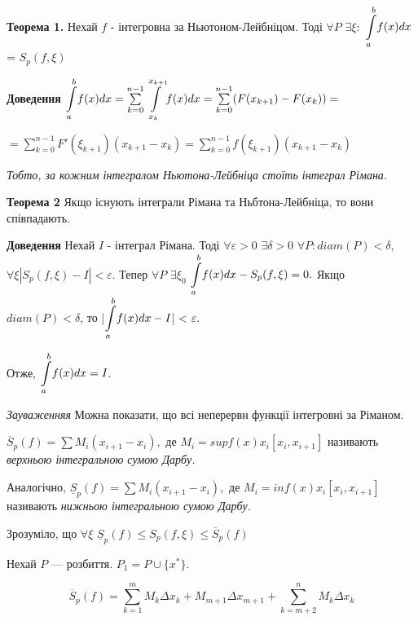 \documentclass[12pt]{report}
\begin{document}
	\textbf{Теорема 1.} Нехай  $ f $ - інтегровна за Ньютоном-Лейбніцом. Тоді $ \forall P  $
	$ \exists \xi : $ $\mathlarger\int\limits_ a^b f(x)dx$ = $ S_p (f, \xi) $
	
	\textbf{Доведення} $\mathlarger\int\limits_ a^b f(x)dx =  \sum\limits_{k=0}^{n-1}\mathlarger\int\limits_{x_k}^{x_{k+1}} f(x)dx = \sum\limits_{k=0}^{n-1}(F(x_{k+1}) - F(x_k)) =$
	
	$=  \sum\limits_{k=0}^{n-1} F'(\xi_{k+1}) (x_{k+1} - x_k) = \sum\limits_{k=0}^{n-1} f(\xi_{k+1})(x_{k+1} - x_k)$
	
	\vspace{5 mm} 
	\textit{Тобто, за кожним інтегралом Ньютона-Лейбніца стоїть інтеграл Рімана.}
	
	\vspace{5 mm} 
	
	\textbf{Теорема 2} Якщо існують інтеграли Рімана та Ньбтона-Лейбніца, то вони співпадають.
	
	\textbf{Доведення} Нехай $ I $ - інтеграл Рімана. Тоді $ \forall \varepsilon > 0 $  $\exists \delta > 0  $ $ \forall P: diam (P)  < \delta , $  $ \forall \xi |S_p(f, \xi) - I| < \varepsilon.$ Тепер 
	$ \forall P$ $ \exists \xi_0  $ $ \mathlarger\int\limits_a^b f(x) dx - S_p (f, \xi) = 0.$
	Якщо $ diam(P)< \delta $, то |$\mathlarger\int\limits_a^b f(x) dx  - I  $| < $ \varepsilon. $
	
	Отже, $\mathlarger\int\limits_a^b f(x) dx   = I$.
	
	\vspace{5 mm} 
	\textit{Зауваженняя} Можна показати, що всі неперервн функції інтегровні за Ріманом.
	
	\vspace{5 mm} 
	
	$ \overline S_p(f) = \sum M_i (x_{i+1} - x_{i}) ,$ де $ M_i = supf(x)  x_i [x_i, x_{i+1}]$
	називають \textit{верхньою інтегральною сумою Дарбу.}
	
	Аналогічно, $ \underline S_p(f) = \sum M_i (x_{i+1} - x_{i}) ,$ де $ M_i = inf(x)  x_i [x_i, x_{i+1}]$ називають \textit{нижньою інтегральною сумою Дарбу.}
	
	\vspace{3 mm} 
	Зрозуміло, що $ \forall \xi  $ $ \underline S_p(f) \leq S_p (f, \xi) \leq  \overline S_p(f)$
	
	
	\vspace{5 mm}
	
	Нехай $P$ --- розбиття. $P_1 = P \cup \{ x^{*}\}$.
	
	$$\overline S_p(f) = \sum_{k = 1}^m M_{k} \Delta x_k + M_{m+1}\Delta x_{m+1} + \sum_{k = m+2}^n M_k \Delta x_k$$
	
\end{document}
